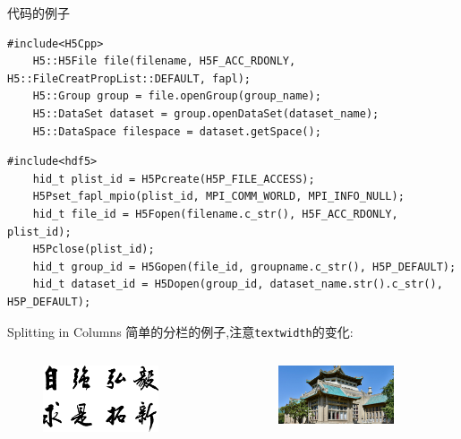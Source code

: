 \documentclass[10pt,aspectratio=169]{beamer}
\begin{document}
\begin{frame}[fragile]{代码的例子}
    \begin{lstlisting}[style=C++]
    #include<H5Cpp>
    H5::H5File file(filename, H5F_ACC_RDONLY, H5::FileCreatPropList::DEFAULT, fapl);
    H5::Group group = file.openGroup(group_name);
    H5::DataSet dataset = group.openDataSet(dataset_name);
    H5::DataSpace filespace = dataset.getSpace();
    \end{lstlisting}
    \begin{lstlisting}[style=C++]
    #include<hdf5>
    hid_t plist_id = H5Pcreate(H5P_FILE_ACCESS);
    H5Pset_fapl_mpio(plist_id, MPI_COMM_WORLD, MPI_INFO_NULL);
    hid_t file_id = H5Fopen(filename.c_str(), H5F_ACC_RDONLY, plist_id);
    H5Pclose(plist_id);
    hid_t group_id = H5Gopen(file_id, groupname.c_str(), H5P_DEFAULT);
    hid_t dataset_id = H5Dopen(group_id, dataset_name.str().c_str(), H5P_DEFAULT);                    
    \end{lstlisting}
\end{frame}
\begin{frame}[fragile]{Splitting in Columns}
简单的分栏的例子,注意\verb|textwidth|的变化:\\
\vspace{30pt}
\begin{columns}
    \begin{column}{0.5\textwidth}
        \begin{figure}
            \includegraphics[width=0.8\textwidth]{source/xiaoxun.png}
        \end{figure}
    \end{column}
    \begin{column}{0.5\textwidth}
        \begin{figure}
            \includegraphics[width=0.8\textwidth]{source/back4.png}
        \end{figure}
    \end{column}
\end{columns}
\end{frame}
\end{document}
